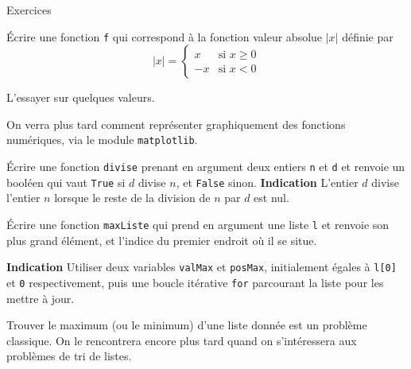 \begin{frame}[fragile]{Exercices}
\begin{exo}
	Écrire une fonction \lstinline|f| qui correspond à la fonction valeur absolue $|x|$ définie par
    \[|x| = 
    \begin{cases}
    x & \text{si $x\geq 0$}\\
    -x & \text{si $x<0$}
    \end{cases}
    \]
    
    L'essayer sur quelques valeurs.
\end{exo}
\pause

On verra plus tard comment représenter graphiquement des fonctions numériques, via le module \lstinline|matplotlib|.

\end{frame}

\begin{frame}[fragile]
\begin{exo}
Écrire une fonction \lstinline|divise| prenant en argument deux entiers \lstinline|n| et \lstinline|d| et renvoie un booléen qui vaut \lstinline|True| si $d$ divise $n$, et \lstinline|False| sinon.
\pause
\textbf{Indication} L'entier $d$ divise l'entier $n$ lorsque le reste de la division de $n$ par $d$ est nul.
\end{exo}
\end{frame}

\begin{frame}[fragile]
\begin{exo}
Écrire une fonction \lstinline|maxListe| qui prend en argument une liste \lstinline|l| et renvoie son plus grand élément, et l'indice du premier endroit où il se situe.
\pause

\textbf{Indication} Utiliser deux variables \lstinline|valMax| et \lstinline|posMax|, initialement égales à \lstinline|l[0]| et \lstinline|0| respectivement, puis une boucle itérative \lstinline|for| parcourant la liste pour les mettre à jour.
\end{exo}
\pause

Trouver le maximum (ou le minimum) d'une liste donnée est un problème classique. On le rencontrera encore plus tard quand on s'intéressera aux problèmes de tri de listes.
\end{frame}

